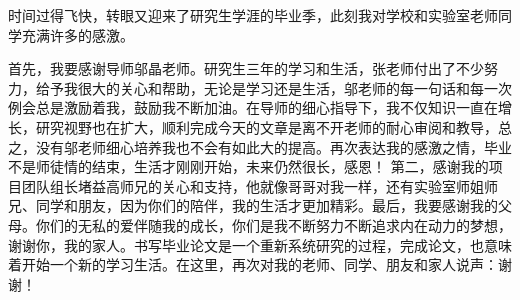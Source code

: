 \begin{thanks}

时间过得飞快，转眼又迎来了研究生学涯的毕业季，此刻我对学校和实验室老师同学充满许多的感激。

首先，我要感谢导师邬晶老师。研究生三年的学习和生活，张老师付出了不少努力，给予我很大的关心和帮助，无论是学习还是生活，邬老师的每一句话和每一次例会总是激励着我，鼓励我不断加油。在导师的细心指导下，我不仅知识一直在增长，研究视野也在扩大，顺利完成今天的文章是离不开老师的耐心审阅和教导，总之，没有邬老师细心培养我也不会有如此大的提高。再次表达我的感激之情，毕业不是师徒情的结束，生活才刚刚开始，未来仍然很长，感恩！
第二，感谢我的项目团队组长堵益高师兄的关心和支持，他就像哥哥对我一样，还有实验室师姐师兄、同学和朋友，因为你们的陪伴，我的生活才更加精彩。最后，我要感谢我的父母。你们的无私的爱伴随我的成长，你们是我不断努力不断追求内在动力的梦想，谢谢你，我的家人。书写毕业论文是一个重新系统研究的过程，完成论文，也意味着开始一个新的学习生活。在这里，再次对我的老师、同学、朋友和家人说声：谢谢！

\end{thanks}
